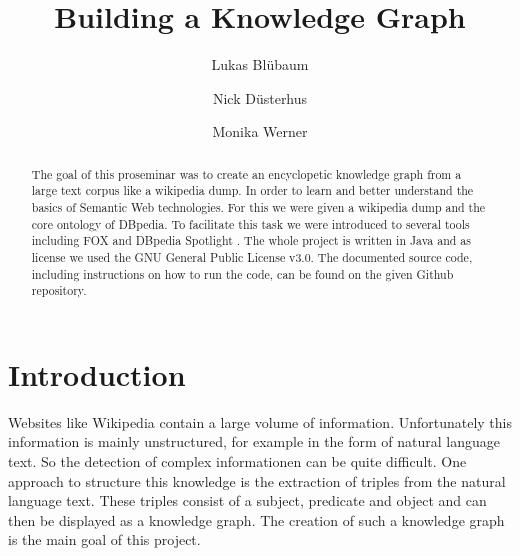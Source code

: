 \documentclass[runningheads]{llncs}
\begin{document}
%
\title{Building a Knowledge Graph}
%
%

\author{Lukas Bl{\"u}baum \and Nick D{\"u}sterhus \and Monika Werner}
%
%
%
\maketitle              %
%
\begin{abstract}
The goal of this proseminar was to create an encyclopetic knowledge graph from a large text corpus like a wikipedia dump. In order to learn and better understand the basics of Semantic Web technologies. For this we were given a wikipedia dump and the core ontology of DBpedia. To facilitate this task we were introduced to several tools including FOX and DBpedia Spotlight \cite{spotlight}. The whole project is written in Java and as license we used the GNU General Public License v3.0. The documented source code, including instructions on how to run the code, can be found on the given Github repository.

\end{abstract}


\section{Introduction}
Websites like Wikipedia contain a large volume of information. Unfortunately this information is mainly unstructured, for example in the form of natural language text. So the detection of complex informationen can be quite difficult. One approach to structure this knowledge is the extraction of triples from the natural language text. These triples consist of a subject, predicate and object and can then be displayed as a knowledge graph. The creation of such a knowledge graph is the main goal of this project. \\
\end{document}
